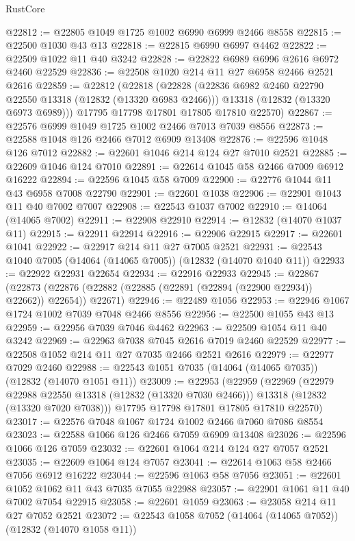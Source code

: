 \begin{lexlean}{RustCore}
\begin{coremodule}
@22812 := @22805 @1049 @1725 @1002 @6990 @6999 @2466 @8558
@22815 := @22500 @1030 @43 @13
@22818 := @22815 @6990 @6997 @4462
@22822 := @22509 @1022 @11 @40 @3242
@22828 := @22822 @6989 @6996 @2616 @6972 @2460 @22529
@22836 := @22508 @1020 @214 @11 @27 @6958 @2466 @2521 @2616
@22859 := @22812
    (@22818
      (@22828
        (@22836 @6982 @2460 @22790 @22550 @13318 (@12832 (@13320 @6983 @2466)))
        @13318
        (@12832 (@13320 @6973 @6989)))
      @17795
      @17798
      @17801
      @17805
      @17810
      @22570)
@22867 := @22576 @6999 @1049 @1725 @1002 @2466 @7013 @7039 @8556
@22873 := @22588 @1048 @126 @2466 @7012 @6909 @13408
@22876 := @22596 @1048 @126 @7012
@22882 := @22601 @1046 @214 @124 @27 @7010 @2521
@22885 := @22609 @1046 @124 @7010
@22891 := @22614 @1045 @58 @2466 @7009 @6912 @16222
@22894 := @22596 @1045 @58 @7009
@22900 := @22776 @1044 @11 @43 @6958 @7008 @22790
@22901 := @22601 @1038
@22906 := @22901 @1043 @11 @40 @7002 @7007
@22908 := @22543 @1037 @7002
@22910 := @14064 (@14065 @7002)
@22911 := @22908 @22910
@22914 := @12832 (@14070 @1037 @11)
@22915 := @22911 @22914
@22916 := @22906 @22915
@22917 := @22601 @1041
@22922 := @22917 @214 @11 @27 @7005 @2521
@22931 := @22543 @1040 @7005 (@14064 (@14065 @7005)) (@12832 (@14070 @1040 @11))
@22933 := @22922 @22931 @22654
@22934 := @22916 @22933
@22945 := @22867
    (@22873 (@22876 (@22882 (@22885 (@22891 (@22894 (@22900 @22934)) @22662)) @22654)) @22671)
@22946 := @22489 @1056
@22953 := @22946 @1067 @1724 @1002 @7039 @7048 @2466 @8556
@22956 := @22500 @1055 @43 @13
@22959 := @22956 @7039 @7046 @4462
@22963 := @22509 @1054 @11 @40 @3242
@22969 := @22963 @7038 @7045 @2616 @7019 @2460 @22529
@22977 := @22508 @1052 @214 @11 @27 @7035 @2466 @2521 @2616
@22979 := @22977 @7029 @2460
@22988 := @22543 @1051 @7035 (@14064 (@14065 @7035)) (@12832 (@14070 @1051 @11))
@23009 := @22953
    (@22959
      (@22969
        (@22979 @22988 @22550 @13318 (@12832 (@13320 @7030 @2466)))
        @13318
        (@12832 (@13320 @7020 @7038)))
      @17795
      @17798
      @17801
      @17805
      @17810
      @22570)
@23017 := @22576 @7048 @1067 @1724 @1002 @2466 @7060 @7086 @8554
@23023 := @22588 @1066 @126 @2466 @7059 @6909 @13408
@23026 := @22596 @1066 @126 @7059
@23032 := @22601 @1064 @214 @124 @27 @7057 @2521
@23035 := @22609 @1064 @124 @7057
@23041 := @22614 @1063 @58 @2466 @7056 @6912 @16222
@23044 := @22596 @1063 @58 @7056
@23051 := @22601 @1052 @1062 @11 @43 @7035 @7055 @22988
@23057 := @22901 @1061 @11 @40 @7002 @7054 @22915
@23058 := @22601 @1059
@23063 := @23058 @214 @11 @27 @7052 @2521
@23072 := @22543 @1058 @7052 (@14064 (@14065 @7052)) (@12832 (@14070 @1058 @11))

\end{coremodule}
\end{lexlean}
